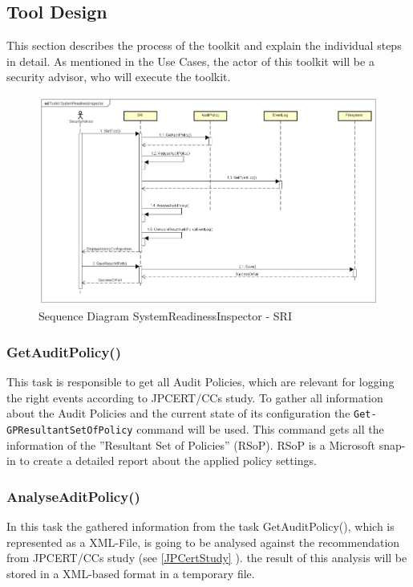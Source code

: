\clearpage

\subsection{Tool Design}
This section describes the process of the toolkit and explain the individual steps in detail. As mentioned in the Use Cases, the actor of this toolkit will be a security advisor, who will execute the toolkit.

\begin{figure}[H]
    \centering
    \includegraphics[width=1\linewidth]{assets/design-tool/SequenceDiagramSRI.png}
    \caption{Sequence Diagram SystemReadinessInspector - SRI}
\end{figure}

\subsubsection{GetAuditPolicy()}
This task is responsible to get all Audit Policies, which are relevant for logging the right events according to JPCERT/CCs study. To gather all information about the Audit Policies and the current state of its configuration the \lstinline|Get-GPResultantSetOfPolicy| command will be used. \cite{GetGPResultantSetOfPolicy} This command gets all the information of the ''Resultant Set of Policies'' (RSoP). \cite{RSoP} RSoP is a Microsoft snap-in to create a detailed report about the applied policy settings. 

\subsubsection{AnalyseAditPolicy()}
In this task the gathered information from the task GetAuditPolicy(), which is represented as a XML-File, is going to be analysed against the recommendation from JPCERT/CCs study (see \ref{JPCertStudy} ). the result of this analysis will be stored in a XML-based format in a temporary file.


